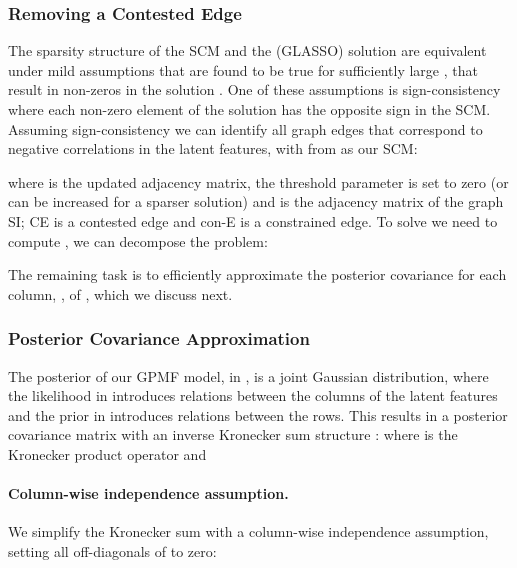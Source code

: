 \documentclass{article}
\theoremstyle{plain}
\theoremstyle{definition}
\theoremstyle{remark}
\begin{document}
\subsubsection{Removing a Contested Edge}
The sparsity structure of the SCM and the (GLASSO) solution are equivalent under mild assumptions that are found to be true for sufficiently large , that result in  non-zeros in the solution \cite{fattahi2017graphical,fattahi2019graphical}. One of these assumptions is sign-consistency where each non-zero element of the solution has the opposite sign in the SCM. Assuming sign-consistency we can identify all graph edges that correspond to negative correlations in the latent features, with  from  as our SCM:




where  is the updated adjacency matrix, the threshold parameter  is set to zero (or can be increased for a sparser solution) and  is the adjacency matrix of the graph SI; CE is a contested edge and con-E is a constrained edge. To solve  we need to compute , we can decompose the problem:


The remaining task is to efficiently approximate the posterior covariance  for each column, , of , which we discuss next.





\subsubsection{Posterior Covariance Approximation} \label{sec:SparsePrecEstMStep:ApproxPostCov}

The posterior of our GPMF model, in , is a joint Gaussian distribution, where the likelihood in  introduces relations between the columns of the latent features and the prior in   introduces relations between the rows. This results in a posterior covariance matrix with an inverse Kronecker sum structure \cite{kalaitzis2013bigraphical,schacke2004kronecker}:  where  is the Kronecker product operator and 





\paragraph{Column-wise independence assumption.} We simplify the Kronecker sum with a column-wise independence assumption, setting all off-diagonals of  to zero:
 
\end{document}
